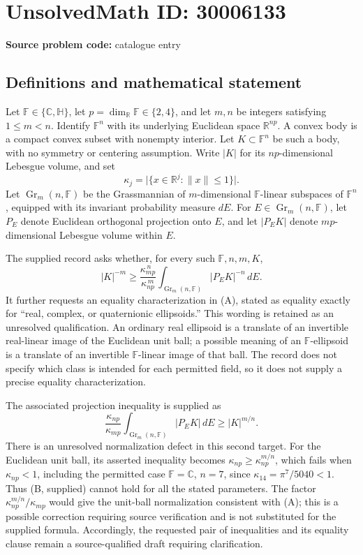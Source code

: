 \documentclass[11pt]{article}
\begin{document}
\section*{UnsolvedMath ID: 30006133}
\textbf{Source problem code:} catalogue entry
\subsection{Definitions and mathematical statement}
Let \(\mathbb F\in\{\mathbb C,\mathbb H\}\), let \(p=\dim_{\mathbb R}\mathbb F\in\{2,4\}\), and let \(m,n\) be integers satisfying \(1\leq m<n\). Identify \(\mathbb F^n\) with its underlying Euclidean space \(\mathbb R^{np}\). A convex body is a compact convex subset with nonempty interior. Let \(K\subset\mathbb F^n\) be such a body, with no symmetry or centering assumption. Write \(|K|\) for its \(np\)-dimensional Lebesgue volume, and set
\[
\kappa_j=\bigl|\{x\in\mathbb R^j:\|x\|\leq1\}\bigr|.
\]
Let \(\operatorname{Gr}_m(n,\mathbb F)\) be the Grassmannian of \(m\)-dimensional \(\mathbb F\)-linear subspaces of \(\mathbb F^n\), equipped with its invariant probability measure \(dE\). For \(E\in\operatorname{Gr}_m(n,\mathbb F)\), let \(P_E\) denote Euclidean orthogonal projection onto \(E\), and let \(|P_EK|\) denote \(mp\)-dimensional Lebesgue volume within \(E\).

The supplied record asks whether, for every such \(\mathbb F,n,m,K\),
\begin{equation}\tag{A}
|K|^{-m}\geq
\frac{\kappa_{mp}^{\,n}}{\kappa_{np}^{\,m}}
\int_{\operatorname{Gr}_m(n,\mathbb F)}|P_EK|^{-n}\,dE.
\end{equation}
It further requests an equality characterization in (A), stated as equality exactly for ``real, complex, or quaternionic ellipsoids.'' This wording is retained as an unresolved qualification. An ordinary real ellipsoid is a translate of an invertible real-linear image of the Euclidean unit ball; a possible meaning of an \(\mathbb F\)-ellipsoid is a translate of an invertible \(\mathbb F\)-linear image of that ball. The record does not specify which class is intended for each permitted field, so it does not supply a precise equality characterization.

The associated projection inequality is supplied as
\begin{equation}\tag{B, supplied}
\frac{\kappa_{np}}{\kappa_{mp}}
\int_{\operatorname{Gr}_m(n,\mathbb F)}|P_EK|\,dE
\geq |K|^{m/n}.
\end{equation}
There is an unresolved normalization defect in this second target. For the Euclidean unit ball, its asserted inequality becomes \(\kappa_{np}\geq\kappa_{np}^{m/n}\), which fails when \(\kappa_{np}<1\), including the permitted case \(\mathbb F=\mathbb C\), \(n=7\), since \(\kappa_{14}=\pi^7/5040<1\). Thus (B, supplied) cannot hold for all the stated parameters. The factor \(\kappa_{np}^{m/n}/\kappa_{mp}\) would give the unit-ball normalization consistent with (A); this is a possible correction requiring source verification and is not substituted for the supplied formula. Accordingly, the requested pair of inequalities and its equality clause remain a source-qualified draft requiring clarification.
\end{document}

